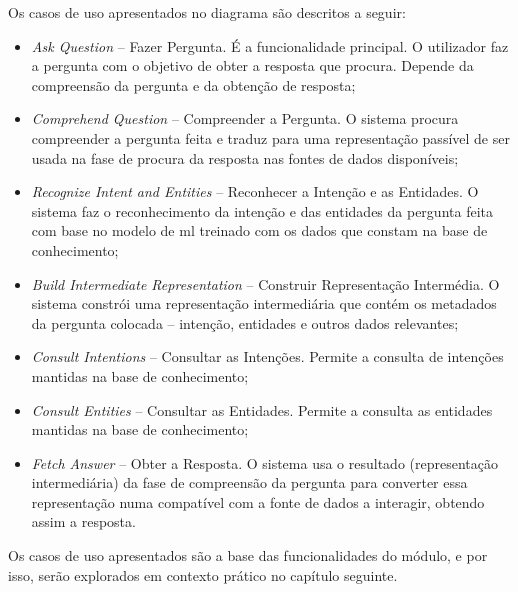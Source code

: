 Os casos de uso apresentados no diagrama são descritos a seguir:
\begin{itemize}
    \item 
    {
        \textit{Ask Question} -- Fazer Pergunta. É a funcionalidade principal. O utilizador faz a pergunta com o objetivo de obter a resposta que procura. Depende da compreensão da pergunta e da obtenção de resposta;
    }
    \item 
    {
        \textit{Comprehend Question} -- Compreender a Pergunta. O sistema procura compreender a pergunta feita e traduz para uma representação passível de ser usada na fase de procura da resposta nas fontes de dados disponíveis;
    }
    \item 
    {
        \textit{Recognize Intent and Entities} -- Reconhecer a Intenção e as Entidades. O sistema faz o reconhecimento da intenção e das entidades da pergunta feita com base no modelo de \gls{ml} treinado com os dados que constam na base de conhecimento;
    }
    \item 
    {
        \textit{Build Intermediate Representation} -- Construir Representação Intermédia. O sistema constrói uma representação intermediária que contém os metadados da pergunta colocada -- intenção, entidades e outros dados relevantes;
    }
    \item 
    {
        \textit{Consult Intentions} -- Consultar as Intenções. Permite a consulta de intenções mantidas na base de conhecimento;
    }
    \item 
    {
        \textit{Consult Entities} -- Consultar as Entidades. Permite a consulta as entidades mantidas na base de conhecimento;
    }
    \item 
    {
        \textit{Fetch Answer} -- Obter a Resposta. O sistema usa o resultado (representação intermediária) da fase de compreensão da pergunta para converter essa representação numa compatível com a fonte de dados a interagir, obtendo assim a resposta.
    }
\end{itemize}

Os casos de uso apresentados são a base das funcionalidades do módulo, e por isso, serão explorados em contexto prático no capítulo seguinte.

